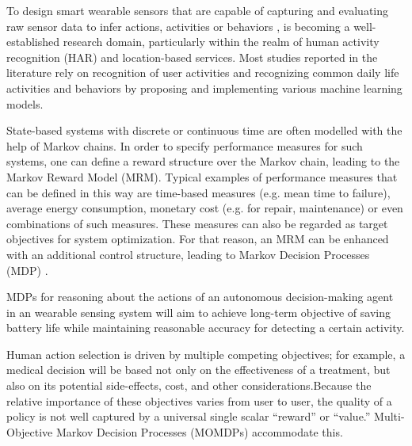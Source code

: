 \documentclass[letterpaper, 10pt, conference]{IEEEtran} %
\begin{document}
To design smart wearable sensors that are capable of capturing and evaluating raw sensor data to infer actions, activities or behaviors \cite{Yurur2015}, is becoming a well-established research domain, particularly within the realm of human activity recognition (HAR) and location-based services. Most studies reported in the literature rely on recognition of user activities and recognizing common daily life activities and  behaviors by proposing and implementing various machine learning models. 



State-based systems with discrete or continuous time are often modelled with the help of Markov chains. In order to specify performance measures for such systems, one can define a reward structure over the Markov chain, leading to the Markov Reward Model (MRM). Typical examples of performance measures that can be defined in this way are time-based measures (e.g. mean time to failure), average energy consumption, monetary cost (e.g. for repair, maintenance) or even combinations of such measures. These measures can also be regarded as target objectives for system optimization. For that reason, an MRM can be enhanced with an additional control structure, leading to Markov Decision Processes (MDP) \cite{Gouberman2014}.

MDPs for reasoning about the actions of an autonomous decision-making agent in an wearable sensing system  will aim to achieve long-term objective of saving battery life while maintaining reasonable accuracy for detecting a certain activity.

Human action selection is driven by multiple
competing objectives; for example, a medical decision will be based not only on the effectiveness
of a treatment, but also on its potential side-effects, cost, and other considerations.Because the relative importance of these objectives varies from user to user, the quality of a policy is not well captured by a universal single scalar “reward” or “value.” Multi-Objective
Markov Decision Processes (MOMDPs) accommodate this.
 
\end{document}
